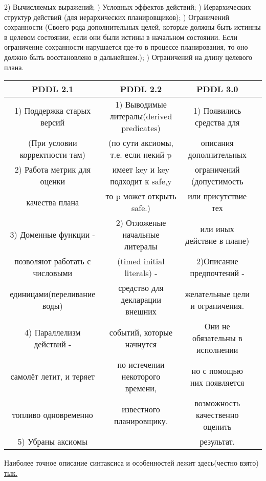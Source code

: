 \documentclass{article}
\begin{document}
2) Вычисляемых выражений; ) Условных эффектов действий; ) Иерархических структур действий (для иерархических планировщиков); ) Ограничений сохранности (Своего рода дополнительных целей, которые должны быть истинны в целевом состоянии, если они были истины в начальном состоянии. Если ограничение сохранности нарушается где-то в процессе планирования, то оно должно быть восстановлено в дальнейшем.); ) Ограничений на длину целевого плана.
\begin{center}
\begin{tabular}{|c|c|c|c|}
\hline
PDDL 2.1 & PDDL 2.2 & PDDL 3.0\\
\hline
1) Поддержка старых версий&1) Выводимые литералы(derived predicates)&1) Появились средства для\\
(При условии корректности там)&(по сути аксиомы, т.е. если некий p& описания дополнительных\\
2) Работа метрик для оценки& имеет key и key подходит к safe,y& ограничений (допустимость\\
 качества плана& то p может открыть safe.)& или присутствие тех\\
3) Доменные функции - &2) Отложеные начальные литералы& или иных действие в плане)\\
позволяют работать с числовыми& (timed initial literals) - & 2)Описание предпочтений -\\
единицами(переливание воды)&средство для декларации внешних& желательные цели и ограничения.\\
4) Параллелизм действий - & событий, которые начнутся& Они не обязательны в исполнении\\
самолёт летит, и теряет&по истечении некоторого времени,& но с помощью них появляется\\
топливо одновременно& известного планировщику. & возможность качественно оценить\\
5) Убраны аксиомы&& результат.\\
\hline
\end{tabular}
\end{center}
Наиболее точное описание синтаксиса и особенностей лежит здесь(честно взято) 
\href{http://ai-center.botik.ru/planning/index.php?ptl=materials/03languages.htm}{тык.}
\end{document}
